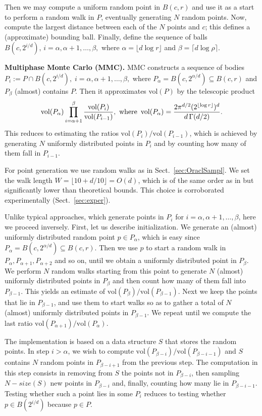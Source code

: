 \documentclass[11pt,a4paper]{article}
\def\vol{\mbox{vol}}
\def\vol{\mbox{vol}}
\begin{document}
Then we may compute a uniform random point in $B(c,r)$ and use it as a start
to perform a random walk in $P$, eventually generating $N$ random points.
Now, compute the largest distance between each of the $N$ points and $c$;
this defines a (approximate) bounding ball.
Finally, define the sequence of balls  
$
B(c,2^{i/d}),\, i= \alpha, \alpha+1 , \dots, \beta,
$
where $\alpha=\lfloor d\log r \rfloor$ and $\beta=\lceil d\log \rho\rceil$. 

\textbf{Multiphase Monte Carlo (MMC).}
MMC constructs a sequence of bodies 
$P_i:=P\cap B(c,2^{i/d}),\; i=\alpha, \alpha+1 , \dots, \beta,$
where $P_{\alpha}=B(c,2^{\alpha/d})\subseteq B(c,r)$ and $P_{\beta}$
(almost) contains $P$.
Then it approximates vol$(P)$ by the telescopic product
$$
\vol(P_{\alpha})\prod_{i=\alpha+1}^{\beta} \frac{\vol(P_i)}{\vol(P_{i-1})},
\,\, 
\mbox{where\, \vol}(P_{\alpha})= \frac{2\pi^{d/2}(2^{\lfloor\log r \rfloor})^d}{d\,\Gamma(d/2)}.
$$
This reduces to estimating the ratios
${\vol(P_i)}/{\vol(P_{i-1})}$, which is achieved by 
generating $N$ uniformly distributed points in ${P_i}$
and by counting how many of them fall in ${P_{i-1}}$.

For point generation we use random walks as in Sect.~\ref{sec:OraclSampl}. 
We set the walk length $W=\lfloor 10+d/10\rfloor=O(d)$, which is of the same
order as in \cite{LovaszD12} but significantly lower than theoretical bounds.
This choice is corroborated experimentally (Sect.~\ref{sec:exper}). 

Unlike typical approaches, which generate points in $P_i$
for $i=\alpha,\alpha+1,\dots,\beta$, here we proceed inversely.
First, let us describe initialization.
We generate an (almost) uniformly distributed random point $p\in P_\alpha$,
which is easy since $P_\alpha=B(c,2^{\alpha/d})\subseteq B(c,r)$.
Then we use $p$ to start a random walk in $P_\alpha,P_{\alpha+1},P_{\alpha+2}$
and so on,
until we obtain a uniformly distributed point in $P_{\beta}$. 
We perform $N$ random walks starting from this point to generate $N$
(almost) uniformly distributed points in $P_{\beta}$ and then
count how many of them fall into $P_{\beta-1}$.
This yields an estimate of $\vol(P_{\beta})/\vol(P_{\beta-1})$.
Next we keep the points that lie in $P_{\beta-1}$,
and use them to start walks so as to gather a total of $N$ (almost) 
uniformly distributed points in $P_{\beta-1}$.
We repeat until we compute the last ratio ${\vol(P_{\alpha+1})}/{\vol(P_{\alpha})}$. 

The implementation is based on
a data structure $S$ that stores the random points.
In step $i>\alpha$, we wish to compute
${\mbox{vol}(P_{\beta-i})}/{\mbox{vol}(P_{\beta-i-1})}$ and $S$ contains $N$ random points in $P_{\beta-i+1}$ from the previous step.
The computation in this step consists in removing from $S$ the points not in
$P_{\beta-i}$, then sampling $N-size(S)$ new points in $P_{\beta-i}$
and, finally, counting how many lie in $P_{\beta-i-1}$.
Testing whether such a point lies in some $P_{i}$
reduces to testing whether $p\in B(2^{i/d})$ because $p\in P$.
\end{document}

